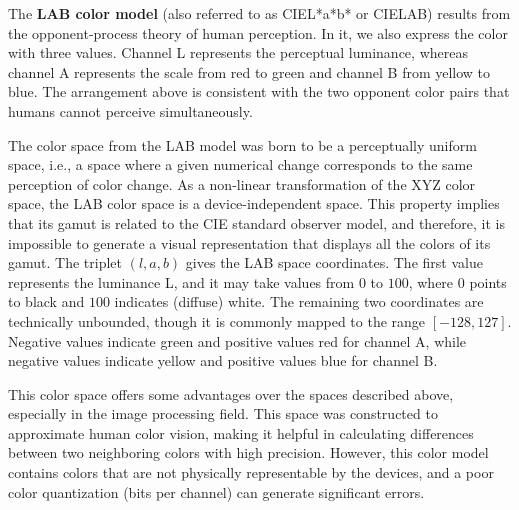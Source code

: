 The \textbf{LAB color model} (also referred to as CIEL*a*b* or CIELAB) results from the opponent-process theory of human perception. In it, we also express the color with three values. Channel L represents the perceptual luminance, whereas channel A represents the scale from red to green and channel B from yellow to blue. The arrangement above is consistent with the two opponent color pairs that humans cannot perceive simultaneously.

The color space from the LAB model was born to be a perceptually uniform space, i.e., a space where a given numerical change corresponds to the same perception of color change. As a non-linear transformation of the XYZ color space, the LAB color space is a device-independent space. This property implies that its gamut is related to the CIE standard observer model, and therefore, it is impossible to generate a visual representation that displays all the colors of its gamut. The triplet $(l,a,b)$ gives the LAB space coordinates. The first value represents the luminance L, and it may take values from $0$ to $100$, where $0$ points to black and $100$ indicates (diffuse) white. The remaining two coordinates are technically unbounded, though it is commonly mapped to the range $[-128, 127]$. Negative values indicate green and positive values red for channel A, while negative values indicate yellow and positive values blue for channel B.

This color space offers some advantages over the spaces described above, especially in the image processing field. This space was constructed to approximate human color vision, making it helpful in calculating differences between two neighboring colors with high precision. However, this color model contains colors that are not physically representable by the devices, and a poor color quantization (bits per channel) can generate significant errors.

